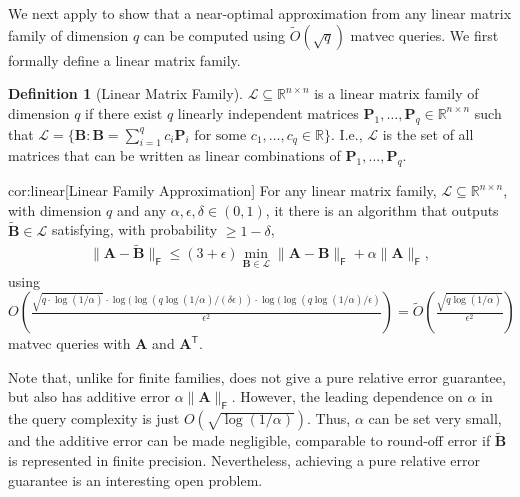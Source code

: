 \documentclass{article}[11pt]
\theoremstyle{definition}
\newtheorem{definition}{Definition}
\newcommand{\bv}[1]{\boldsymbol{\mathbf{#1}}}
\newcommand{\T}{\mathsf{T}}
\newcommand{\Fro}{\mathsf{F}}
\begin{document}
        We next apply  to show that a near-optimal approximation from any linear matrix family of dimension $q$ can be computed using $\tilde O(\sqrt{q})$ matvec queries. We first formally define a linear matrix family.

\begin{definition}[Linear Matrix Family]\label{def:linear}
    $\mathcal{L} \subseteq \mathbb{R}^{n \times n}$ 
    is a linear matrix family of dimension $q$ if there exist $q$ linearly independent matrices $\bv P_1,\ldots,\bv P_q \in \mathbb{R}^{n \times n}$ such that $\mathcal{L} = \{\bv B : \bv B = \sum_{i=1}^q c_i \bv P_i\text{ for some }c_1,\ldots,c_q \in \mathbb{R}\}$. I.e., $\mathcal{L}$ is the set of all matrices that can be written as linear combinations of $\bv P_1,\ldots, \bv P_q$.
\end{definition}

        \begin{repcorollary}{cor:linear}[Linear Family Approximation]
            For any linear matrix family, $\mathcal{L} \subseteq \mathbb{R}^{n \times n}$, with dimension $q$ and any $\alpha,\epsilon,\delta \in (0,1)$, it there is an algorithm that outputs $\bv{\tilde{B}} \in \mathcal{L}$ satisfying, with probability $\ge 1-\delta$,
            \begin{align*}
                \|\bv{A} - \bv{\tilde{B}}\|_\Fro \leq (3+\epsilon)\min_{\bv{B}\in \mathcal{L}}\|\bv{A} - \bv{B}\|_\Fro + \alpha\|\bv{A}\|_\Fro,
            \end{align*}
             using $O\left(\frac{\sqrt{q \cdot \log(1/\alpha)} \cdot \log(\log(q \log(1/\alpha)/(\delta \epsilon)) \cdot \log(\log(q \log(1/\alpha)/\epsilon)}{\epsilon^2}\right) = \tilde O \left (\frac{\sqrt{q \log(1/\alpha)}}{\epsilon^2} \right )$ matvec queries with $\bv A$ and $\bv A^\T$.
        \end{repcorollary}
        Note that, unlike  for finite families,  does not give a pure relative error guarantee, but also has additive error $\alpha \|\bv A\|_\Fro$. However, the leading dependence on $\alpha$ in the query complexity is just $O(\sqrt{\log(1/\alpha)})$. Thus, $\alpha$ can be set very small, and the additive error can be made negligible, comparable to round-off error if $\bv{\tilde B}$ is represented in finite precision. Nevertheless, achieving a pure relative error guarantee is an interesting open problem.
\end{document}
